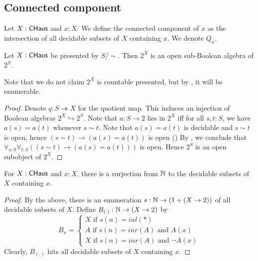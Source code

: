 \subsection{Connected component}
\begin{definition}
  Let $X:\mathsf{CHaus}$ and $x:X$. 
  We define the connected component of $x$
  as the intersection of all decidable subsets of $X$ containing $x$. 
  We denote $Q_x$.
\end{definition}

\begin{lemma}
  Let $X:\mathsf{CHaus}$ be presented by $S/\sim$. 
  Then $2^X$ is an open sub-Boolean algebra of $2^S$. 
\end{lemma}
Note that we do not claim $2^X$ is countable presented, 
but by , it will be enumerable. 
\begin{proof}
  Denote $q:S \twoheadrightarrow X$ for the quotient map. 
  This induces an injection of Boolean algebras $2^X \hookrightarrow 2^S$.
  Note that $a:S\to 2$ lies in $2^X$ iff for all $s,t:S$, we have $a(s) = a(t)$ whenever $s\sim t$.
  Note that $a(s) = a(t)$ is decidable and $s\sim t$ is open, hence 
  $(s\sim t) \to (a(s) = a(t))$ is open ()
  By , we conclude that 
  $\forall_{s:S} \forall_{t:S} ((s\sim t) \to (a(s) = a(t)))$ is open. 
  Hence $2^S$ is an open subobject of $2^X$. 
\end{proof}
\begin{corollary}
  For $X:\mathsf{CHaus}$ and $x:X$, there is a surjection from $\mathbb{N}$ to the decidable subsets of $X$ containing $x$. 
\end{corollary}
\begin{proof}
  By the above, %
  there is an enumeration $s: \mathbb{N} \to (1 + (X \to 2))$ of all decidable subsets of $X$. 
  Define $B_{(\cdot)}:\mathbb{N} \to (X \to 2)$ by 
  $$B_n = \begin{cases}
    X \text { if } s(n) = inl(*) \\
    A \text { if } s(n) = inr(A) \text { and } A(x) \\
    X \text { if } s(n) = inr(A) \text { and } \neg A(x)
  \end{cases}
  $$
  Clearly, $B_{(\cdot)}$ hits all decidable subsets of $X$ containing $x$. 
\end{proof}


